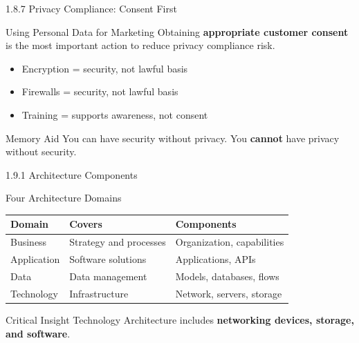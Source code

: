 \documentclass{beamer}
\begin{document}
	\begin{frame}{1.8.7 Privacy Compliance: Consent First}
		\begin{block}{Using Personal Data for Marketing}
			Obtaining \textbf{appropriate customer consent} is the most important action to reduce privacy compliance risk.
		\end{block}
		\begin{itemize}
			\item Encryption = security, not lawful basis
			\item Firewalls = security, not lawful basis
			\item Training = supports awareness, not consent
		\end{itemize}
		\begin{exampleblock}{Memory Aid}
			You can have security without privacy. You \textbf{cannot} have privacy without security.
		\end{exampleblock}
	\end{frame}
	
	\begin{frame}{1.9.1 Architecture Components}
		\begin{block}{Four Architecture Domains}
			\begin{tabular}{|p{2.5cm}|p{4cm}|p{4.5cm}|}
				\hline
				\textbf{Domain} & \textbf{Covers} & \textbf{Components} \\
				\hline
				Business & Strategy and processes & Organization, capabilities \\
				\hline
				Application & Software solutions & Applications, APIs \\
				\hline
				Data & Data management & Models, databases, flows \\
				\hline
				Technology & Infrastructure & Network, servers, storage \\
				\hline
			\end{tabular}
		\end{block}
		\begin{alertblock}{Critical Insight}
			Technology Architecture includes \textbf{networking devices, storage, and software}.
		\end{alertblock}
	\end{frame}
	
\end{document}
